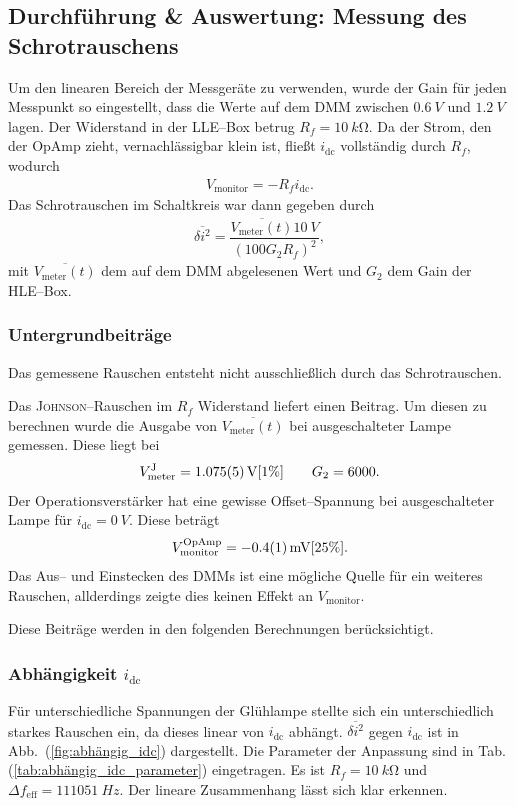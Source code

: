 \documentclass[sn-mathphys-num,iicol]{sn-jnl}
\theoremstyle{thmstyleone}
\theoremstyle{thmstyletwo}
\theoremstyle{thmstylethree}
\begin{document}
\subsection{Durchführung \& Auswertung: Messung des Schrotrauschens}
Um den linearen Bereich der Messgeräte zu verwenden, wurde der Gain für jeden Messpunkt so eingestellt, dass die Werte auf dem DMM zwischen $\SI{0.6}{V}$ und $\SI{1.2}{V}$ lagen.
Der Widerstand in der LLE--Box betrug $R_f=\SI{10}{k\ohm}$.
Da der Strom, den der OpAmp zieht, vernachlässigbar klein ist, fließt $i_\text{dc}$ vollständig durch $R_f$, wodurch
\begin{align}
	V_\text{monitor}=-R_fi_\text{dc}
	.\end{align}
Das Schrotrauschen im Schaltkreis war dann gegeben durch
\begin{align}
	\overline{\delta i^2}=\dfrac{\overline{V_\text{meter}(t)}\SI{10}{V}}{(100G_2R_f)^2}
	,\end{align}
mit $\overline{V_\text{meter}(t)}$ dem auf dem DMM abgelesenen Wert und $G_2$ dem Gain der HLE--Box.

\subsubsection{Untergrundbeiträge}
Das gemessene Rauschen entsteht nicht ausschließlich durch das Schrotrauschen.

Das \textsc{Johnson}--Rauschen im $R_f$ Widerstand liefert einen Beitrag.
Um diesen zu berechnen wurde die Ausgabe von $\overline{V_\text{meter}(t)}$ bei ausgeschalteter Lampe gemessen.
Diese liegt bei
\begin{align}
  V_\text{meter}^\text{J}=\SI{1.075+-0.005}{V}[1\%]\qquad G_2=6000
	.\end{align}
Der Operationsverstärker hat eine gewisse Offset--Spannung bei ausgeschalteter Lampe für $i_\text{dc}=\SI{0}{V}$.
Diese beträgt
\begin{align}
  V_\text{monitor}^\text{OpAmp}=\SI{-0.4+-0.1}{mV}[25\%] %
	.\end{align}
Das Aus-- und Einstecken des DMMs ist eine mögliche Quelle für ein weiteres Rauschen, allderdings zeigte dies keinen Effekt an $V_\text{monitor}$.

Diese Beiträge werden in den folgenden Berechnungen berücksichtigt.

\subsubsection{Abhängigkeit $i_\text{dc}$}
Für unterschiedliche Spannungen der Glühlampe stellte sich ein unterschiedlich starkes Rauschen ein, da dieses linear von $i_\text{dc}$ abhängt.
$\overline{\delta i^2}$ gegen $i_\text{dc}$ ist in Abb.\ (\ref{fig:abhängig_idc}) dargestellt.
Die Parameter der Anpassung sind in Tab. (\ref{tab:abhängig_idc_parameter}) eingetragen.
Es ist $R_f=\SI{10}{k\ohm}$ und $\Delta f_\text{eff}=\SI{111051}{Hz}$.
Der lineare Zusammenhang lässt sich klar erkennen. %
\end{document}
